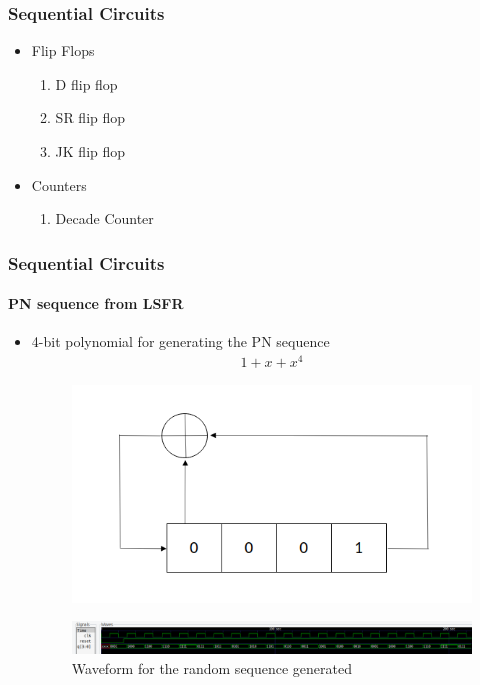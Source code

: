 \documentclass{beamer}
\begin{document}
\begin{frame}
	\frametitle{Sequential Circuits}
	\begin{itemize}
		\item Flip Flops
			\begin{enumerate}
				\item D flip flop
				\item SR flip flop
				\item JK flip flop
			\end{enumerate}
		\item Counters
			\begin{enumerate}
				\item Decade Counter
			\end{enumerate}
	\end{itemize}
\end{frame}

\begin{frame}
	\frametitle{Sequential Circuits}
	\framesubtitle{PN sequence from LSFR}
	\begin{itemize}
		\item 4-bit polynomial for generating the PN sequence
			\begin{align}
				1 + x + x^4
			\end{align}
		\begin{figure}[h!]
  		\centering
    			\includegraphics[width=0.5\linewidth]{./figs/LSFR.png}
		\end{figure}	
		\begin{figure}[h!]
  		\centering
    			\includegraphics[width=\linewidth]{./figs/pn.png}
		\caption{Waveform for the random sequence generated}
		\end{figure}	
	\end{itemize}

\end{frame}
\end{document}
